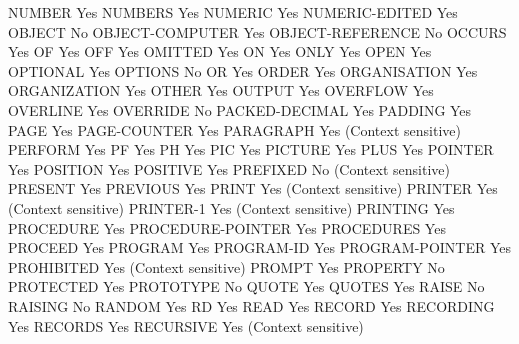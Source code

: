 NUMBER                          Yes
NUMBERS                         Yes
NUMERIC                         Yes
NUMERIC-EDITED                  Yes
OBJECT                          No
OBJECT-COMPUTER                 Yes
OBJECT-REFERENCE                No
OCCURS                          Yes
OF                              Yes
OFF                             Yes
OMITTED                         Yes
ON                              Yes
ONLY                            Yes
OPEN                            Yes
OPTIONAL                        Yes
OPTIONS                         No
OR                              Yes
ORDER                           Yes
ORGANISATION                    Yes
ORGANIZATION                    Yes
OTHER                           Yes
OUTPUT                          Yes
OVERFLOW                        Yes
OVERLINE                        Yes
OVERRIDE                        No
PACKED-DECIMAL                  Yes
PADDING                         Yes
PAGE                            Yes
PAGE-COUNTER                    Yes
PARAGRAPH                       Yes (Context sensitive)
PERFORM                         Yes
PF                              Yes
PH                              Yes
PIC                             Yes
PICTURE                         Yes
PLUS                            Yes
POINTER                         Yes
POSITION                        Yes
POSITIVE                        Yes
PREFIXED                        No (Context sensitive)
PRESENT                         Yes
PREVIOUS                        Yes
PRINT                           Yes (Context sensitive)
PRINTER                         Yes (Context sensitive)
PRINTER-1                       Yes (Context sensitive)
PRINTING                        Yes
PROCEDURE                       Yes
PROCEDURE-POINTER               Yes
PROCEDURES                      Yes
PROCEED                         Yes
PROGRAM                         Yes
PROGRAM-ID                      Yes
PROGRAM-POINTER                 Yes
PROHIBITED                      Yes (Context sensitive)
PROMPT                          Yes
PROPERTY                        No
PROTECTED                       Yes
PROTOTYPE                       No
QUOTE                           Yes
QUOTES                          Yes
RAISE                           No
RAISING                         No
RANDOM                          Yes
RD                              Yes
READ                            Yes
RECORD                          Yes
RECORDING                       Yes
RECORDS                         Yes
RECURSIVE                       Yes (Context sensitive)
